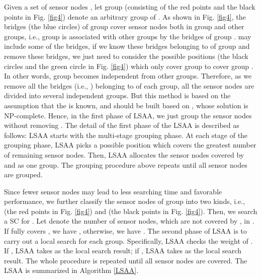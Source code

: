 \documentclass[journal]{IEEEtran}
\begin{document}
Given a set of sensor nodes , let group  (consisting of the red points and the black points in Fig. \ref{fig4}) denote an arbitrary group of . As shown in Fig. \ref{fig4}, the bridges (the blue circles) of group  cover sensor nodes both in group  and other groups, i.e., group  is associated with other groups by the bridges of group .  may include some of the bridges, if we know these bridges belonging to  of group  and remove these bridges, we just need to consider the possible positions (the black circles and the green circle in Fig. \ref{fig4}) which only cover group  to cover group . In other words, group  becomes independent from other groups. Therefore, as we remove all the bridges (i.e., ) belonging to  of each group, all the sensor nodes are divided into several independent groups. But this method is based on the assumption that the  is known, and  should be built based on , whose solution is NP-complete. Hence, in the first phase of LSAA, we just group the sensor nodes without removing .
The detail of the first phase of the LSAA is described as follows: LSAA starts with the multi-stage grouping phase. At each stage of the grouping phase, LSAA picks a possible position 
which covers the greatest number of remaining sensor nodes. Then, LSAA allocates the sensor nodes covered by  and  as one group. The
grouping procedure above repeats until all sensor nodes are grouped.

Since fewer sensor nodes may lead to less searching time and favorable performance, we further classify the sensor nodes of group  into two kinds, i.e.,
 (the red points in Fig. \ref{fig4}) and  (the black points in Fig. \ref{fig4}). Then, we search a SC  for . Let  denote the number of sensor nodes, which are not covered by , in .
If  fully covers , we have , otherwise, we have . The second phase of LSAA is to carry out
a local search for each group. Specifically, LSAA checks the weight  of . If , LSAA takes  as the local search
result; if , LSAA takes  as the local search result. The whole procedure is repeated until all sensor nodes are covered. The LSAA is summarized in Algorithm \ref{LSAA}.
\end{document}
